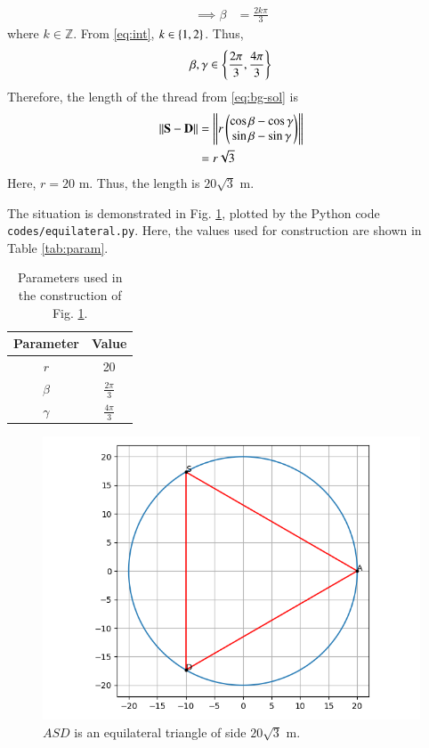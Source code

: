 \documentclass[journal,12pt,twocolumn]{IEEEtran}
\renewcommand{\vec}[1]{\boldsymbol{\mathbf{#1}}}
\begin{document}
\begin{enumerate}
\begin{align}
        \implies \beta &= \frac{2k\pi}{3}
    \end{align}
    where $k \in \mathbb{Z}$. From \eqref{eq:int}, $k \in \left\{1,2\right\}$.
    Thus,
    \begin{align}
        \beta,\gamma \in \left\{\frac{2\pi}{3},\frac{4\pi}{3}\right\}
        \label{eq:bg-sol}
    \end{align}
    Therefore, the length of the thread from \eqref{eq:bg-sol} is
    \begin{align}
        \norm{\vec{S}-\vec{D}} &= \norm{r\myvec{\cos\beta-\cos\gamma\\\sin\beta-\sin\gamma}} \\
                               &= r\sqrt{3}
    \end{align}
    Here, $r = 20$ m. Thus, the length is $20\sqrt{3}$ m.

    The situation is demonstrated in Fig. \ref{fig:equilateral}, plotted by the 
    Python code \texttt{codes/equilateral.py}. Here, the values used for 
    construction are shown in Table \eqref{tab:param}.
    \begin{table}[!ht]
        \centering
        \begin{tabular}{|c|c|}
            \hline
            \textbf{Parameter} & \textbf{Value} \\
            \hline
            $r$ & 20 \\
            \hline
            $\beta$ & $\frac{2\pi}{3}$ \\
            \hline
            $\gamma$ & $\frac{4\pi}{3}$ \\
            \hline
        \end{tabular}
        \caption{Parameters used in the construction of Fig. \ref{fig:equilateral}.}
        \label{tab:param}
    \end{table}
    \begin{figure}[!ht]
        \centering
        \includegraphics[width=\columnwidth]{figs/equilateral.png}
        \caption{$ASD$ is an equilateral triangle of side $20\sqrt{3}$ m.}
        \label{fig:equilateral}
    \end{figure}
\end{enumerate}
\end{document}
